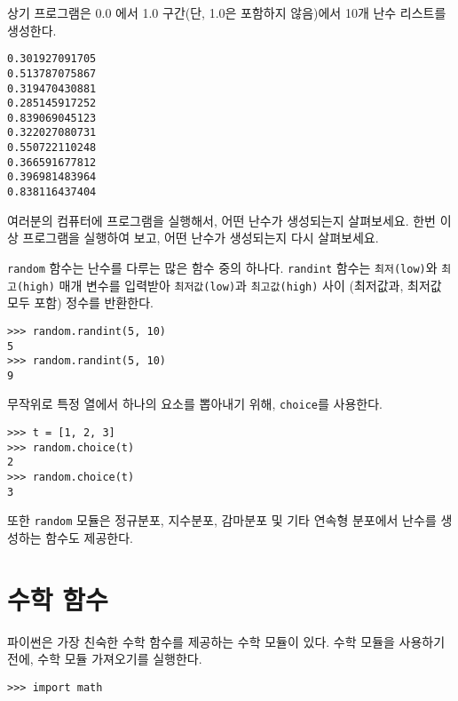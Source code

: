 상기 프로그램은 0.0 에서 1.0 구간(단,  1.0은 포함하지 않음)에서 10개 난수 리스트를 생성한다.

\beforeverb
\begin{verbatim}
0.301927091705
0.513787075867
0.319470430881
0.285145917252
0.839069045123
0.322027080731
0.550722110248
0.366591677812
0.396981483964
0.838116437404
\end{verbatim}
\afterverb
%

\begin{ex}
여러분의 컴퓨터에 프로그램을 실행해서, 어떤 난수가 생성되는지 살펴보세요.
한번 이상 프로그램을 실행하여 보고, 어떤 난수가 생성되는지 다시 살펴보세요.
\end{ex}

{\tt random} 함수는 난수를 다루는 많은 함수 중의 하나다.
{\tt randint} 함수는 {\tt 최저(low)}와 {\tt 최고(high)} 매개 변수를 입력받아 
{\tt 최저값(low)}과 {\tt 최고값(high)} 사이 (최저값과, 최저값 모두 포함) 정수를 반환한다.


\beforeverb
\begin{verbatim}
>>> random.randint(5, 10)
5
>>> random.randint(5, 10)
9
\end{verbatim}
\afterverb
%

무작위로 특정 열에서 하나의 요소를 뽑아내기 위해, {\tt choice}를 사용한다.


\beforeverb
\begin{verbatim}
>>> t = [1, 2, 3]
>>> random.choice(t)
2
>>> random.choice(t)
3
\end{verbatim}
\afterverb
%

또한 {\tt random} 모듈은 정규분포, 지수분포, 감마분포 및 기타 연속형 분포에서 난수를 생성하는 함수도 제공한다.

\section{수학 함수}

파이썬은 가장 친숙한 수학 함수를 제공하는 수학 모듈이 있다.
수학 모듈을 사용하기 전에, 수학 모듈 가져오기를 실행한다.

\beforeverb
\begin{verbatim}
>>> import math
\end{verbatim}
\afterverb
%

